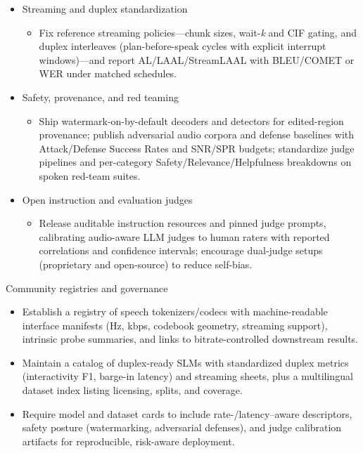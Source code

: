 \documentclass{article}
\begin{document}
\begin{itemize}
  \item Streaming and duplex standardization
  \begin{itemize}
    \item Fix reference streaming policies---chunk sizes, wait-\emph{k} and CIF gating, and duplex interleaves (plan-before-speak cycles with explicit interrupt windows)---and report AL/LAAL/StreamLAAL with BLEU/COMET or WER under matched schedules.
  \end{itemize}

  \item Safety, provenance, and red teaming
  \begin{itemize}
    \item Ship watermark-on-by-default decoders and detectors for edited-region provenance; publish adversarial audio corpora and defense baselines with Attack/Defense Success Rates and SNR/SPR budgets; standardize judge pipelines and per-category Safety/Relevance/Helpfulness breakdowns on spoken red-team suites.
  \end{itemize}

  \item Open instruction and evaluation judges
  \begin{itemize}
    \item Release auditable instruction resources and pinned judge prompts, calibrating audio-aware LLM judges to human raters with reported correlations and confidence intervals; encourage dual-judge setups (proprietary and open-source) to reduce self-bias.
  \end{itemize}

\end{itemize}

Community registries and governance

\begin{itemize}
  \item Establish a registry of speech tokenizers/codecs with machine-readable interface manifests (Hz, kbps, codebook geometry, streaming support), intrinsic probe summaries, and links to bitrate-controlled downstream results.
  \item Maintain a catalog of duplex-ready SLMs with standardized duplex metrics (interactivity F1, barge-in latency) and streaming sheets, plus a multilingual dataset index listing licensing, splits, and coverage.
  \item Require model and dataset cards to include rate-/latency--aware descriptors, safety posture (watermarking, adversarial defenses), and judge calibration artifacts for reproducible, risk-aware deployment.
\end{itemize}
\end{document}
